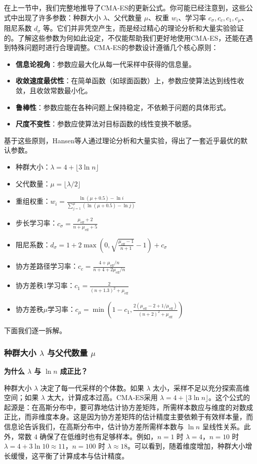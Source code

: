 \documentclass[lang=cn,zihao=-4,a4paper,fontset=windows]{beautybook}
\begin{document}
在上一节中，我们完整地推导了CMA-ES的更新公式。你可能已经注意到，这些公式中出现了许多参数：种群大小 $\lambda$、父代数量 $\mu$、权重 $w_i$、学习率 $c_\sigma, c_c, c_1, c_\mu$、阻尼系数 $d_\sigma$ 等。它们并非凭空产生，而是经过精心的理论分析和大量实验验证的。了解这些参数为何如此设定，不仅能帮助我们更好地使用CMA-ES，还能在遇到特殊问题时进行合理调整。CMA-ES的参数设计遵循几个核心原则：
\begin{itemize}
    \item \textbf{信息论视角}：参数应最大化从每一代采样中获得的信息量。
    \item \textbf{收敛速度最优性}：在简单函数（如球面函数）上，参数应使算法达到线性收敛，且收敛常数最小化。
    \item \textbf{鲁棒性}：参数应能在各种问题上保持稳定，不依赖于问题的具体形式。
    \item \textbf{尺度不变性}：参数应使算法对目标函数的线性变换不敏感。
\end{itemize}
基于这些原则，Hansen等人通过理论分析和大量实验，得出了一套近乎最优的默认参数。
\begin{itemize}
    \item 种群大小：$\lambda = 4 + \lfloor 3\ln n \rfloor$
    \item 父代数量：$\mu = \lfloor \lambda/2 \rfloor$
    \item 重组权重：$w_i = \frac{\ln(\mu+0.5) - \ln i}{\sum_{j=1}^{\mu} (\ln(\mu+0.5) - \ln j)}$
    \item 步长学习率：$c_\sigma = \frac{\mu_{\text{eff}}+2}{n+\mu_{\text{eff}}+5}$
    \item 阻尼系数：$d_\sigma = 1 + 2\max(0, \sqrt{\frac{\mu_{\text{eff}}-1}{n+1}}-1) + c_\sigma$
    \item 协方差路径学习率：$c_c = \frac{4+\mu_{\text{eff}}/n}{n+4+2\mu_{\text{eff}}/n}$
    \item 协方差秩1学习率：$c_1 = \frac{2}{(n+1.3)^2+\mu_{\text{eff}}}$
    \item 协方差秩$\mu$学习率：$c_\mu = \min(1-c_1, \frac{2(\mu_{\text{eff}}-2+1/\mu_{\text{eff}})}{(n+2)^2+\mu_{\text{eff}}})$
\end{itemize}
下面我们逐一拆解。

\subsubsection{种群大小 $\lambda$ 与父代数量 $\mu$}

\textbf{为什么 $\lambda$ 与 $\ln n$ 成正比？}

种群大小 $\lambda$ 决定了每一代采样的个体数。如果 $\lambda$ 太小，采样不足以充分探索高维空间；如果 $\lambda$ 太大，计算成本过高。CMA-ES采用 $\lambda = 4 + \lfloor 3\ln n \rfloor$。这个公式的起源是：在高斯分布中，要可靠地估计协方差矩阵，所需样本数应与维度的对数成正比，而非维度本身。这是因为协方差矩阵的估计精度主要依赖于有效样本量，而信息论告诉我们，在高斯分布中，估计协方差所需样本数与 $\ln n$ 呈线性关系。此外，常数 $4$ 确保了在低维时也有足够样本。例如，$n=1$ 时 $\lambda=4$，$n=10$ 时 $\lambda=4+3\ln10\approx 11$，$n=100$ 时 $\lambda\approx 18$。可以看到，随着维度增加，种群大小增长缓慢，这平衡了计算成本与估计精度。
\end{document}
